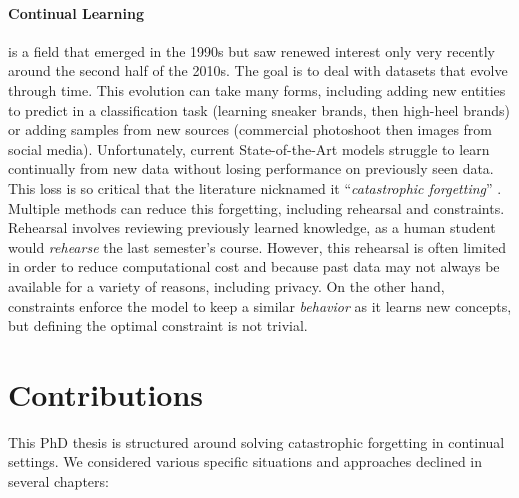 \paragraph{Continual Learning} is a field that emerged in the 1990s but saw renewed interest only
very recently around the second half of the 2010s. The goal is to deal with datasets that evolve
through time. This evolution can take many forms, including adding new entities to predict in a
classification task (\eg learning sneaker brands, then high-heel brands) or adding samples from new
sources (\eg commercial photoshoot then images from social media). Unfortunately, current
State-of-the-Art models struggle to learn continually from new data without losing performance on
previously seen data. This loss is so critical that the literature nicknamed it ``\textit{catastrophic
      forgetting}'' \citep{robins1995catastrophicforgetting,french1999catastrophicforgetting}. Multiple
methods can reduce this forgetting, including rehearsal and constraints. Rehearsal involves
reviewing previously learned knowledge, as a human student would \textit{rehearse} the last
semester's course. However, this rehearsal is often limited in order to reduce computational cost
and because past data may not always be available for a variety of reasons, including privacy. On
the other hand, constraints enforce the model to keep a similar \textit{behavior} as it learns new
concepts, but defining the optimal constraint is not trivial.

\section{Contributions}

This PhD thesis is structured around solving catastrophic forgetting in continual settings. We
considered various specific situations and approaches declined in several chapters:

